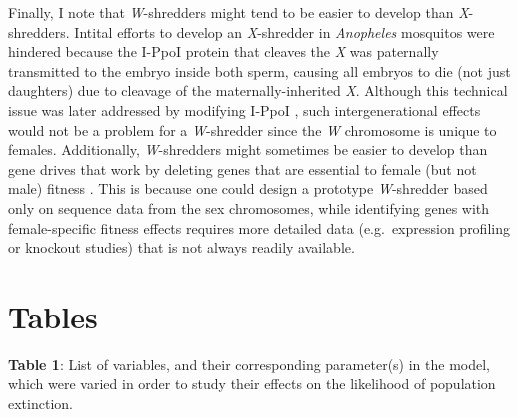 \documentclass[]{rsos}%
\begin{document}
Finally, I note that \emph{W}-shredders might tend to be easier to
develop than \emph{X}-shredders. Intital efforts to develop an
\emph{X}-shredder in \emph{Anopheles} mosquitos were hindered because
the I-PpoI protein that cleaves the \emph{X} was paternally transmitted
to the embryo inside both sperm, causing all embryos to die (not just
daughters) due to cleavage of the maternally-inherited \emph{X}.
Although this technical issue was later addressed by modifying I-PpoI
\citep{galizi2014sy}, such intergenerational effects would not be a
problem for a \emph{W}-shredder since the \emph{W} chromosome is unique
to females. Additionally, \emph{W}-shredders might sometimes be easier
to develop than gene drives that work by deleting genes that are
essential to female (but not male) fitness \citep[e.g.][]{burt2018se}.
This is because one could design a prototype \emph{W}-shredder based
only on sequence data from the sex chromosomes, while identifying genes
with female-specific fitness effects requires more detailed data
(e.g.~expression profiling or knockout studies) that is not always
readily available.

\newpage

\hypertarget{tables}{%
\section{Tables}\label{tables}}

\textbf{Table 1}: List of variables, and their corresponding
parameter(s) in the model, which were varied in order to study their
effects on the likelihood of population extinction.
\end{document}

